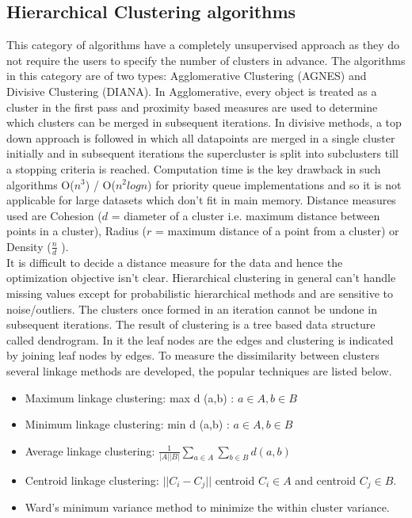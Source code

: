\subsection{Hierarchical Clustering algorithms}

This category of algorithms have a completely unsupervised approach as they do not require the users to specify the number of clusters in advance. The algorithms in this category are of two types: Agglomerative Clustering (AGNES) and Divisive Clustering (DIANA). In Agglomerative, every object is treated as a cluster in the first pass and proximity based measures are used to determine which clusters can be merged in subsequent iterations. In divisive methods, a top down approach is followed in which all datapoints are merged in a single cluster initially and in subsequent iterations the supercluster is split into subclusters till a stopping criteria is reached. Computation time is the key drawback in such algorithms O($n^3$) / O($n^2 log n$) for priority queue implementations and so it is not applicable for large datasets which don't fit in main memory. Distance measures used are Cohesion ($d$ = diameter of a cluster i.e. maximum distance between points in a cluster), Radius ($r$ = maximum distance of a point from a cluster) or Density ($\frac{n}{d}$ ). \\

It is difficult to decide a distance measure for the data and hence the optimization objective isn't clear. Hierarchical clustering in general can't handle missing values except for probabilistic hierarchical methods and are sensitive to noise/outliers. The clusters once formed in an iteration cannot be undone in subsequent iterations. The result of clustering is a tree based data structure called dendrogram. In it the leaf nodes are the edges and clustering is indicated by joining leaf nodes by edges. To measure the dissimilarity between clusters several linkage methods are developed, the popular techniques are listed below. \\

\begin{itemize}
\item Maximum linkage clustering: max { d (a,b) : $a \in A, b \in B$}
\item Minimum linkage clustering: min { d (a,b) : $a \in A, b \in B$}
\item Average linkage clustering: $\frac{1}{|A||B|} \sum_{a \in A} \sum_{b \in B} d(a,b)$ 
\item Centroid linkage clustering: $||C_i - C_j||$ centroid $C_i \in A$ and centroid $C_j \in B$.
\item Ward's minimum variance method to minimize the within cluster variance. \\
\end{itemize}


